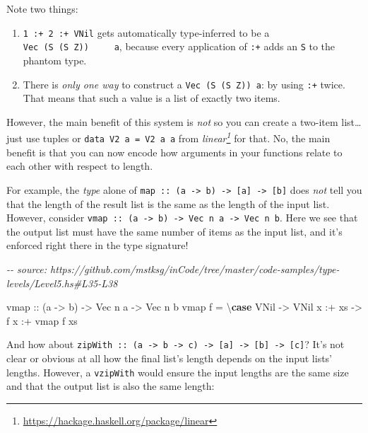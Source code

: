 \documentclass[]{article}
\newenvironment{Shaded}{}{}
\newcommand{\CommentTok}[1]{\textcolor[rgb]{0.38,0.63,0.69}{\textit{#1}}}
\newcommand{\DataTypeTok}[1]{\textcolor[rgb]{0.56,0.13,0.00}{#1}}
\newcommand{\KeywordTok}[1]{\textcolor[rgb]{0.00,0.44,0.13}{\textbf{#1}}}
\newcommand{\NormalTok}[1]{#1}
\newcommand{\OperatorTok}[1]{\textcolor[rgb]{0.40,0.40,0.40}{#1}}
\newcommand{\OtherTok}[1]{\textcolor[rgb]{0.00,0.44,0.13}{#1}}
\renewcommand{\href}[2]{#2\footnote{\url{#1}}}
\begin{document}
Note two things:

\begin{enumerate}
\def\labelenumi{\arabic{enumi}.}
\tightlist
\item
  \texttt{1\ :+\ 2\ :+\ VNil} gets automatically type-inferred to be a
  \texttt{Vec\ (S\ (S\ Z))\ \ \ \ \ a}, because every application of \texttt{:+}
  adds an \texttt{S} to the phantom type.
\item
  There is \emph{only one way} to construct a \texttt{Vec\ (S\ (S\ Z))\ a}: by
  using \texttt{:+} twice. That means that such a value is a list of exactly two
  items.
\end{enumerate}

However, the main benefit of this system is \emph{not} so you can create a
two-item list\ldots just use tuples or \texttt{data\ V2\ a\ =\ V2\ a\ a} from
\emph{\href{https://hackage.haskell.org/package/linear}{linear}} for that. No,
the main benefit is that you can now encode how arguments in your functions
relate to each other with respect to length.

For example, the \emph{type} alone of
\texttt{map\ ::\ (a\ -\textgreater{}\ b)\ -\textgreater{}\ {[}a{]}\ -\textgreater{}\ {[}b{]}}
does \emph{not} tell you that the length of the result list is the same as the
length of the input list. However, consider
\texttt{vmap\ ::\ (a\ -\textgreater{}\ b)\ -\textgreater{}\ Vec\ n\ a\ -\textgreater{}\ Vec\ n\ b}.
Here we see that the output list must have the same number of items as the input
list, and it's enforced right there in the type signature!

\begin{Shaded}
\begin{Highlighting}[]
\CommentTok{{-}{-} source: https://github.com/mstksg/inCode/tree/master/code{-}samples/type{-}levels/Level5.hs\#L35{-}L38}

\OtherTok{vmap ::}\NormalTok{ (a }\OtherTok{{-}\textgreater{}}\NormalTok{ b) }\OtherTok{{-}\textgreater{}} \DataTypeTok{Vec}\NormalTok{ n a }\OtherTok{{-}\textgreater{}} \DataTypeTok{Vec}\NormalTok{ n b}
\NormalTok{vmap f }\OtherTok{=}\NormalTok{ \textbackslash{}}\KeywordTok{case}
  \DataTypeTok{VNil} \OtherTok{{-}\textgreater{}} \DataTypeTok{VNil}
\NormalTok{  x }\OperatorTok{:+}\NormalTok{ xs }\OtherTok{{-}\textgreater{}}\NormalTok{ f x }\OperatorTok{:+}\NormalTok{ vmap f xs}
\end{Highlighting}
\end{Shaded}

And how about
\texttt{zipWith\ ::\ (a\ -\textgreater{}\ b\ -\textgreater{}\ c)\ -\textgreater{}\ {[}a{]}\ -\textgreater{}\ {[}b{]}\ -\textgreater{}\ {[}c{]}}?
It's not clear or obvious at all how the final list's length depends on the
input lists' lengths. However, a \texttt{vzipWith} would ensure the input
lengths are the same size and that the output list is also the same length:
\end{document}
